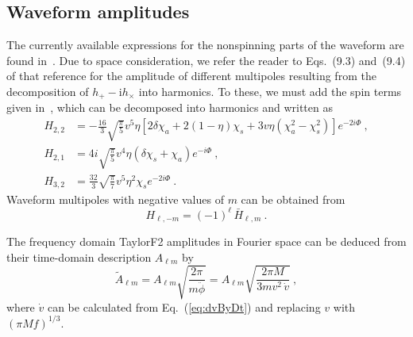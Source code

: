\subsection{Waveform amplitudes}
\label{sec:WaveformAmplitudes}
The currently available expressions for the nonspinning parts
of the waveform are found in~\cite{Blanchet:2008}. 
Due to space consideration, we refer the reader to Eqs.~(9.3) and~(9.4)
of that reference for the amplitude of different multipoles resulting 
from the decomposition of $h_+ - \mathrm{i} h_\times$ into harmonics.  
To these, we must add
the spin terms given in~\cite{WillWiseman:1996}, which can be decomposed into
harmonics and written as~\cite{Pekowsky:2009}
\begin{align}
  \label{eq:SpinAmplitudeTerms}
  H_{2,2} &= -\frac{16}{3} \sqrt{\frac{\pi}{5}} v^5 \eta \left[2 \delta
    \chi_{a} + 2(1-\eta) \chi_{s} + 3 v \eta \left(\chi_{a}^2 -
      \chi_{s}^2 \right) \right] e^{-2 i \Phi}~, \\
  H_{2,1} &= 4 i \sqrt{\frac{\pi}{5}} v^4 \eta (\delta \chi_{s} +
  \chi_{a}) e^{-i \Phi}~, \\
  H_{3,2} &= \frac{32}{3} \sqrt{\frac{\pi}{7}} v^5 \eta^2 \chi_{s}
  e^{-2 i \Phi}~.
\end{align}
Waveform multipoles with negative values of $m$ can be obtained from
\begin{equation}
  \label{eq:NegativeMModes}
  H_{\ell, -m} = (-1)^{\ell}\, \bar{H}_{\ell,m}~.
\end{equation}

The frequency domain TaylorF2 amplitudes in Fourier space can be deduced
from their time-domain description $A_{\ell m}$ by
\begin{equation}
 \tilde A_{\ell m} = A_{\ell m} \sqrt{\frac{2\pi}{m \ddot \phi}} =
A_{\ell m} \sqrt{\frac{2 \pi M}{3m v^2 \, \dot v}}~,
\end{equation}
where $\dot v$ can be calculated from Eq.~(\ref{eq:dvByDt}) and 
replacing $v$ with $(\pi M f)^{1/3}$.


